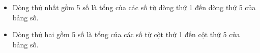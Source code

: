 \begin{itemize}
	\item Dòng thứ nhất gồm 5 số là tổng của các số từ dòng thứ 1 đến dòng thứ 5 của bảng số.
	\item Dòng thứ hai gồm 5 số là tổng của các số từ cột thứ 1 đến cột thứ 5 của bảng số.
\end{itemize}

\